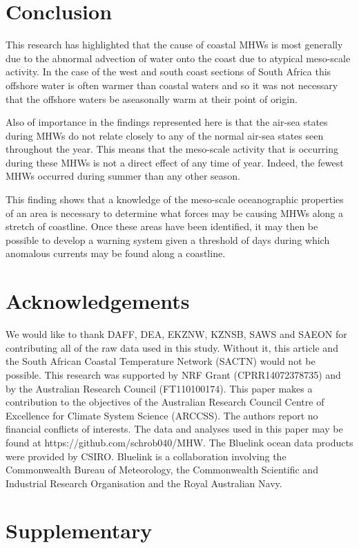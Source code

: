 \documentclass[a4paper,10pt,review]{elsarticle}
\begin{document}
\section{Conclusion}
This research has highlighted that the cause of coastal MHWs is most generally due to the abnormal advection of water onto the coast due to atypical meso-scale activity. In the case of the west and south coast sections of South Africa this offshore water is often warmer than coastal waters and so it was not necessary that the offshore waters be aseasonally warm at their point of origin.

Also of importance in the findings represented here is that the air-sea states during MHWs do not relate closely to any of the normal air-sea states seen throughout the year. This means that the meso-scale activity that is occurring during these MHWs is not a direct effect of any time of year. Indeed, the fewest MHWs occurred during summer than any other season.

This finding shows that a knowledge of the meso-scale oceanographic properties of an area is necessary to determine what forces may be causing MHWs along a stretch of coastline. Once these areas have been identified, it may then be possible to develop a warning system given a threshold of days during which anomalous currents may be found along a coastline. 

\section*{Acknowledgements}
We would like to thank DAFF, DEA, EKZNW, KZNSB, SAWS and SAEON for contributing all of the raw data used in this study. Without it, this article and the South African Coastal Temperature Network (SACTN) would not be possible. This research was supported by NRF Grant (CPRR14072378735) and by the Australian Research Council (FT110100174). This paper makes a contribution to the objectives of the Australian Research Council Centre of Excellence for Climate System Science (ARCCSS). The authors report no financial conflicts of interests. The data and analyses used in this paper may be found at https://github.com/schrob040/MHW. The Bluelink ocean data products were provided by CSIRO. Bluelink is a collaboration involving the Commonwealth Bureau of Meteorology, the Commonwealth Scientific and Industrial Research Organisation and the Royal Australian Navy.

\section*{Supplementary}
\end{document}
